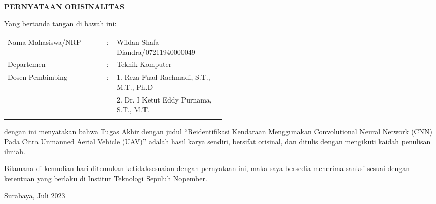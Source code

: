 \begin{center}
  \large
  \textbf{PERNYATAAN ORISINALITAS}
\end{center}

\thispagestyle{empty}

\vspace{2ex}

\noindent
Yang bertanda tangan di bawah ini:

\vspace{2ex}

\begin{adjustwidth}{0.5cm}{}
  \begin{tabular}{lcp{0.5\linewidth}}

    Nama Mahasiswa/NRP & : & Wildan Shafa Diandra/07211940000049     \\

    Departemen         & : & Teknik Komputer                         \\

    Dosen Pembimbing   & : & 1. Reza Fuad Rachmadi, S.T., M.T., Ph.D \\
                       &   & 2. Dr. I Ketut Eddy Purnama, S.T., M.T. \\                                                        \\
  \end{tabular}
\end{adjustwidth}


dengan ini menyatakan bahwa Tugas Akhir dengan judul “Reidentifikasi Kendaraan Menggunakan Convolutional Neural Network (CNN) Pada Citra Unmanned Aerial Vehicle (UAV)” adalah hasil karya sendiri, bersifat orisinal, dan ditulis dengan mengikuti kaidah penulisan ilmiah.

Bilamana di kemudian hari ditemukan ketidaksesuaian dengan pernyataan ini, maka saya bersedia menerima sanksi sesuai dengan ketentuan yang berlaku di Institut Teknologi Sepuluh Nopember.

\vspace{2ex}

\begin{flushright}
  Surabaya, Juli 2023
\end{flushright}

